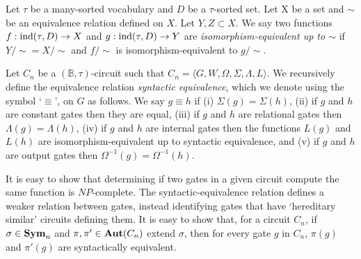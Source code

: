 \documentclass[../paper.tex]{subfiles}
\begin{document}


\begin{definition}
  Let $\tau$ be a many-sorted vocabulary and $D$ be a $\tau$-sorted set. Let X
  be a set and $\sim$ be an equivalence relation defined on $X$. Let $Y, Z
  \subset X$. We say two functions $f : \text{\upshape ind}(\tau,D) \rightarrow X$ and $g :
  \text{\upshape ind}(\tau, D) \rightarrow Y$ are \emph{isomorphism-equivalent up to $\sim$} if
  $Y/{\sim} = X/{\sim}$ and $f/{\sim}$ is isomorphism-equivalent to $g/{\sim}$.
\end{definition}

\begin{definition}
  Let $C_n$ be a $(\mathbb{B}, \tau)$-circuit such that $C_n = \langle G, W,
  \Omega, \Sigma, \Lambda, L\rangle$. We recursively define the equivalence
  relation \emph{syntactic equivalence}, which we denote using the symbol
  `$\equiv$', on $G$ as follows. We say $g \equiv h$ if (i) $\Sigma(g) =
  \Sigma(h)$, (ii) if $g$ and $h$ are constant gates then they are equal, (iii)
  if $g$ and $h$ are relational gates then $\Lambda(g) = \Lambda(h)$, (iv) if
  $g$ and $h$ are internal gates then the functions $L(g)$ and $L(h)$ are
  isomorphism-equivalent up to syntactic equivalence, and (v) if $g$ and $h$ are
  output gates then $\Omega^{-1}(g) = \Omega^{-1}(h)$.
\end{definition}

It is easy to show that determining if two gates in a given circuit compute the
same function is $NP$-complete. The syntactic-equivalence relation defines a
weaker relation between gates, instead identifying gates that have `hereditary
similar' circuits defining them. It is easy to show that, for a circuit $C_n$,
if $\sigma \in \text{\textbf{Sym}}_n$ and $\pi, \pi' \in \text{\textbf{Aut}}(C_n)$ extend $\sigma$, then for
every gate $g$ in $C_n$, $\pi (g)$ and $\pi'(g)$ are syntactically equivalent.
\end{document}
